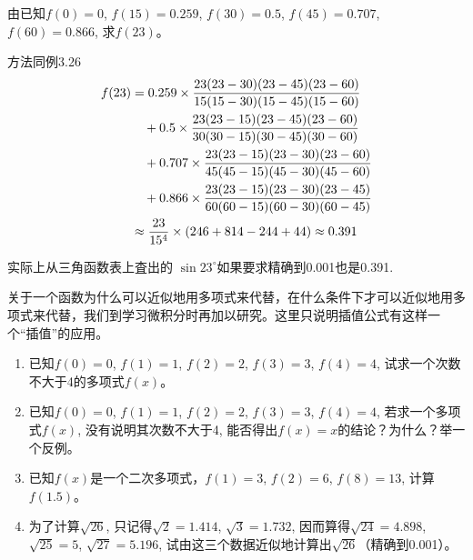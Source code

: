 \begin{solution}
    由已知$f(0)=0$, $f(15)=0. 259$, $f(30)=0. 5$, $f(45)=0. 707$, $f(60)=0. 866$, 求$f(23)$。

方法同例3.26
\[\begin{split}
    f(23)&=0. 259\times \dfrac{23 (23-30) (23-45)(23-60)}{15 (15-30) (15-45)(15-60)}\\
    &\quad +0. 5\times \dfrac{23 (23-15) (23-45)(23-60)}{30 (30-15) (30-45)(30-60)}\\
&\quad +0. 707\times \dfrac{23 (23-15) (23-30)(23-60)}{45 (45-15) (45-30)(45-60)}\\
&\quad +0.866\times \dfrac{23 (23-15) (23-30)(23-45)}{60 (60-15) (60-30)(60-45)}\\
&\approx \dfrac{23}{15^4}\times (246+814-244+44) \approx 0. 391
\end{split}\]

实际上从三角函数表上査出的 $\sin23^{\circ}$如果要求精确到0.001也是0.391.
\end{solution}

关于一个函数为什么可以近似地用多项式来代替，在什么条件下才可以近似地用多项式来代替，我们到学习微积分时再加以研究。这里只说明插值公式有这样一个“插值”的应用。

\begin{ex}
    \begin{enumerate}
    \item 已知$f(0)=0$, $f(1)=1$, $f(2)=2$, $f(3)=3$,
    $f(4)=4$, 试求一个次数不大于4的多项式$f(x)$。
    \item 已知$f(0)=0$, $f(1)=1$, $f(2)=2$, $f(3)=3$,
    $f(4)=4$, 若求一个多项式$f(x)$, 没有说明其次数不大于4, 能否得出$f(x)=x$的结论？为什么？举一个反例。
    \item 已知$f(x)$是一个二次多项式，$f(1)=3$, $f(2)=6$, $f(8)=13$, 计算$f(1. 5)$。
    \item 为了计算$\sqrt{26}$, 只记得$\sqrt{2}=1. 414$, $\sqrt{3}=1. 732$, 因而算得$\sqrt{24}=4.898$, $\sqrt{25}=5$, $\sqrt{27}=5. 196$, 试由这三个数据近似地计算出$\sqrt{26}$（精确到0.001）。
    \end{enumerate} 
    \end{ex}
    
